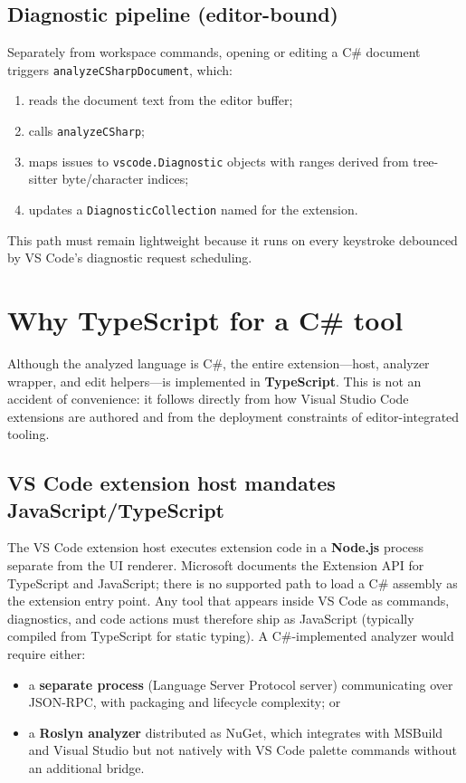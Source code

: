 \subsection{Diagnostic pipeline (editor-bound)}

Separately from workspace commands, opening or editing a C\# document triggers \texttt{analyzeCSharpDocument}, which:
\begin{enumerate}
	\item reads the document text from the editor buffer;
	\item calls \texttt{analyzeCSharp};
	\item maps issues to \texttt{vscode.Diagnostic} objects with ranges derived from tree-sitter byte/character indices;
	\item updates a \texttt{DiagnosticCollection} named for the extension.
\end{enumerate}

This path must remain lightweight because it runs on every keystroke debounced by VS Code's diagnostic request scheduling.

\section{Why TypeScript for a C\# tool}
\label{chap2:typescript}

Although the analyzed language is C\#, the entire extension---host, analyzer wrapper, and edit helpers---is implemented in \textbf{TypeScript}. This is not an accident of convenience: it follows directly from how Visual Studio Code extensions are authored and from the deployment constraints of editor-integrated tooling.

\subsection{VS Code extension host mandates JavaScript/TypeScript}

The VS Code extension host executes extension code in a \textbf{Node.js} process separate from the UI renderer. Microsoft documents the Extension API for TypeScript and JavaScript; there is no supported path to load a C\# assembly as the extension entry point. Any tool that appears inside VS Code as commands, diagnostics, and code actions must therefore ship as JavaScript (typically compiled from TypeScript for static typing). A C\#-implemented analyzer would require either:
\begin{itemize}
	\item a \textbf{separate process} (Language Server Protocol server) communicating over JSON-RPC, with packaging and lifecycle complexity; or
	\item a \textbf{Roslyn analyzer} distributed as NuGet, which integrates with MSBuild and Visual Studio but not natively with VS Code palette commands without an additional bridge.
\end{itemize}

